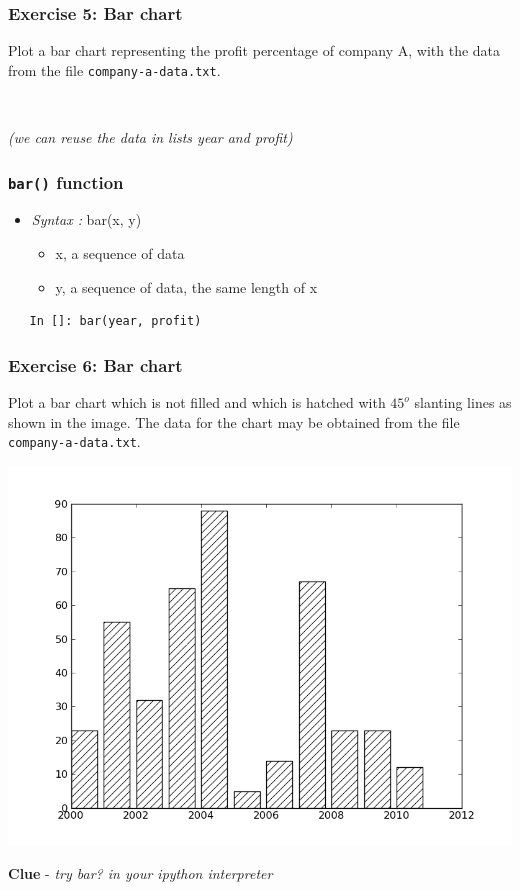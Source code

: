 \documentclass[presentation]{beamer}
\begin{document}
\begin{frame}[fragile]
\frametitle{Exercise 5: Bar chart}
\label{sec-10}

  Plot a bar chart representing the profit percentage of company A, with the data 
  from the file \texttt{company-a-data.txt}.
\begin{verbatim}
   
\end{verbatim}

  \emph{(we can reuse the data in lists year and profit)}
\end{frame}
\begin{frame}[fragile]
\frametitle{\texttt{bar()} function}
\label{sec-11}

\begin{itemize}
\item \emph{Syntax :} bar(x, y)

\begin{itemize}
\item x, a sequence of data
\item y, a sequence of data, the same length of x
\end{itemize}

\end{itemize}

\begin{verbatim}
   In []: bar(year, profit)
\end{verbatim}
\end{frame}
\begin{frame}
\frametitle{Exercise 6: Bar chart}
\label{sec-12}

  Plot a bar chart which is not filled and which is hatched with 
    $45^o$
  slanting lines as shown in the image. The data for the chart may be
  obtained from the file \texttt{company-a-data.txt}.
   \begin{center}
      \includegraphics[scale=0.3]{bar-chart-hatch}    
    \end{center}
  \textbf{Clue} - \emph{try bar? in your ipython interpreter}
\end{frame}
\end{document}
